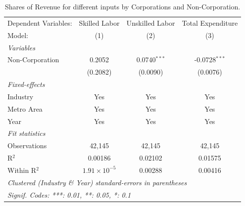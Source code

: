 \documentclass[
  12pt]{article}
\theoremstyle{definition}
\theoremstyle{remark}
\begin{document}
\begin{table}

\caption{\label{tbl-reg-shares-2}Shares of Revenue for different inputs
by Corporations and Non-Corporation.}

\begin{minipage}{\linewidth}

\begingroup
\centering
\begin{tabular}{lccc}
   \tabularnewline \midrule \midrule
   Dependent Variables: & Skilled Labor         & Unskilled Labor & Total Expenditure\\  
   Model:               & (1)                   & (2)             & (3)\\  
   \midrule
   \emph{Variables}\\
   Non-Corporation      & 0.2052                & 0.0740$^{***}$  & -0.0728$^{***}$\\   
                        & (0.2082)              & (0.0090)        & (0.0076)\\   
   \midrule
   \emph{Fixed-effects}\\
   Industry             & Yes                   & Yes             & Yes\\  
   Metro Area           & Yes                   & Yes             & Yes\\  
   Year                 & Yes                   & Yes             & Yes\\  
   \midrule
   \emph{Fit statistics}\\
   Observations         & 42,145                & 42,145          & 42,145\\  
   R$^2$                & 0.00186               & 0.02102         & 0.01575\\  
   Within R$^2$         & $1.91\times 10^{-5}$  & 0.00288         & 0.00416\\  
   \midrule \midrule
   \multicolumn{4}{l}{\emph{Clustered (Industry \& Year) standard-errors in parentheses}}\\
   \multicolumn{4}{l}{\emph{Signif. Codes: ***: 0.01, **: 0.05, *: 0.1}}\\
\end{tabular}
\par\endgroup

\end{minipage}%

\end{table}%
\end{document}
